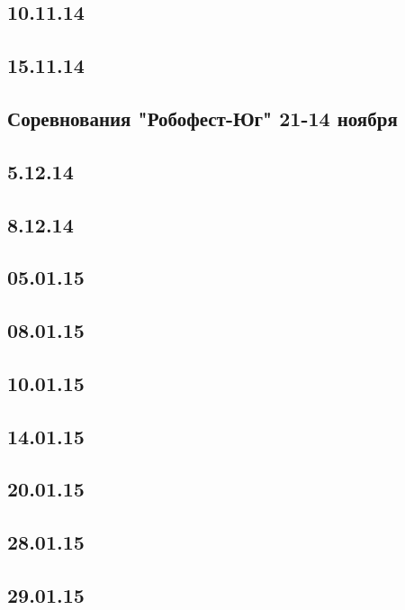 \documentclass[11pt]{article}
\begin{document}
	\subsection{10.11.14}
	
	
	\subsection{15.11.14}
	

	\subsection{Соревнования "Робофест-Юг" 21-14 ноября }
	
	
	\subsection{5.12.14}
	
	
	\subsection{8.12.14}
	

	\subsection{05.01.15}
	

	\subsection{08.01.15}
	

	\subsection{10.01.15}
	
	
	\subsection{14.01.15}
	

	\subsection{20.01.15}
	
	
	\subsection{28.01.15}
	

	\subsection{29.01.15}
	
\end{document}
